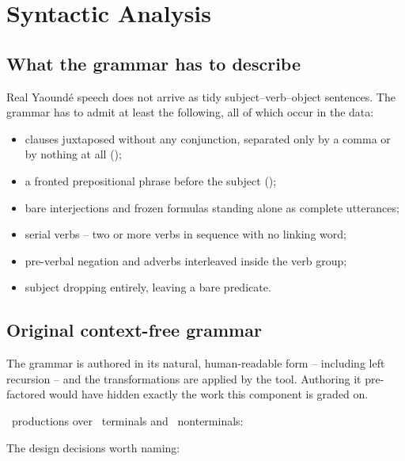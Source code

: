 \section{Syntactic Analysis}\label{sec:syntax}

\subsection{What the grammar has to describe}

Real Yaound\'e speech does not arrive as tidy subject--verb--object sentences. The grammar
has to admit at least the following, all of which occur in the data:

\begin{itemize}[leftmargin=1.4em, itemsep=0.2em]
  \item clauses juxtaposed without any conjunction, separated only by a comma or by
        nothing at all ();
  \item a fronted prepositional phrase before the subject ();
  \item bare interjections and frozen formulas standing alone as complete utterances;
  \item serial verbs -- two or more verbs in sequence with no linking word;
  \item pre-verbal negation and adverbs interleaved inside the verb group;
  \item subject dropping entirely, leaving a bare predicate.
\end{itemize}

\subsection{Original context-free grammar}

The grammar is authored in its natural, human-readable form -- including left recursion --
and the transformations are applied by the tool. Authoring it pre-factored would have hidden
exactly the work this component is graded on.

\ProductionCount\ productions over \TerminalCount\ terminals and \NonterminalCount\
nonterminals:



The design decisions worth naming:

